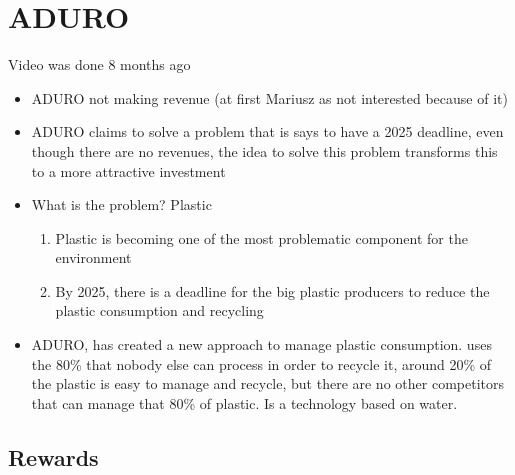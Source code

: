 \documentclass{article}
\begin{document}
\section{ADURO}
Video was done 8 months ago

\begin{itemize}
  \item ADURO not making revenue (at first Mariusz as not interested because of it)

  \item ADURO claims to solve a problem that is says to have a 2025 deadline,
    even though there are no revenues, the idea to solve this problem transforms
    this to a more attractive investment

  \item What is the problem? Plastic 
    \begin{enumerate}
      \item Plastic is becoming one of the most problematic component for the
        environment
      \item By 2025, there is a deadline for the big plastic producers to reduce
        the plastic consumption and recycling 
    \end{enumerate}
  \item ADURO, has created a new approach to manage plastic consumption. 
    uses the 80\% that nobody else can process in order to recycle it, around 20\% of the
    plastic is easy to manage and recycle, but there are no other competitors
    that can manage that 80\% of plastic. Is a technology based on water.
\end{itemize}

\subsection{Rewards}
\end{document}
